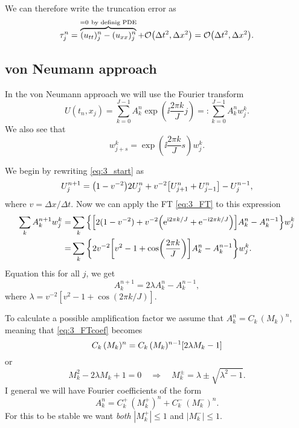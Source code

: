 \documentclass[11pt,letter, swedish, english
]{article}
\newcommand{\Dx}{\ensuremath{\Delta{x}}}
\newcommand{\Dt}{\ensuremath{\Delta{t}}}
\begin{document}
We can therefore write the truncation error as
\begin{equation}
\tau_j^n=
\overbrace{(u_{tt})_j^n-(u_{xx})_j^n}^{=0\ \text{by definig PDE}}
+\order{\Dt^2, \Dx^2}=\order{\Dt^2, \Dx^2}.
\end{equation}

\subsection{von Neumann approach}
In the von Neumann approach we will use the Fourier transform
\begin{equation}\label{eq:3_FT}
U(t_n,x_j)=\sum_{k=0}^{J-1} A_k^n\exp(\ii\frac{2\pi k}{J}j)
=:\sum_{k=0}^{J-1} A_k^nw_j^k.
\end{equation}
We also see that
\begin{equation}
w_{j+s}^k=\exp(\ii\frac{2\pi k}{J}s)w_j^k.
\end{equation}

We begin by rewriting \eqref{eq:3_start} as
\begin{equation}
U_j^{n+1}=\qty(1-v^{-2})2U_j^n+v^{-2}\qty[U_{j+1}^n+U_{j-1}^n]
-U_j^{n-1},
\end{equation}
where $v=\Dx/\Dt$. Now we can apply the FT \eqref{eq:3_FT} to this
expression
\begin{equation}
\begin{aligned}
\sum_kA_k^{n+1}w_j^k=&\sum_k \qty{\qty[
2(1-v^{-2})+v^{-2}\qty(\mathrm{e}^{\mathrm{i}2\pi k/J}+\mathrm{e}^{-\mathrm{i}2\pi k/J})]A_k^n
-A_k^{n-1} }w_j^k\\
=&\sum_k \qty{2v^{-2}\qty[
v^{2}-1+\cos(\frac{2\pi k}{J})]A_k^n
-A_k^{n-1} }w_j^k.
\end{aligned}
\end{equation}
Equation this for all $j$, we get
\begin{equation}\label{eq:3_FTcoef}
A_k^{n+1}=2\lambda A_k^n-A_k^{n-1},
\end{equation}
where $\lambda=v^{-2}[v^{2}-1+\cos(2\pi k/J)]$.

To calculate a possible amplification factor we assume that
$A_k^n=C_k\,(M_k)^n$, meaning that \eqref{eq:3_FTcoef} becomes
\begin{equation}
C_k\,(M_k)^n=C_k\,(M_k)^{n-1}\qty[2\lambda M_k-1]
\end{equation}
or
\begin{equation}
M_k^2-2\lambda M_k+1=0
\quad\Longrightarrow\quad
M_k^\pm=\lambda\pm\sqrt{\lambda^2-1}.
\end{equation}
I  general we will have Fourier coefficients of the form
\begin{equation}
A_k^n=C_k^+\,(M_k^+)^n+C_k^-\,(M_k^-)^n.
\end{equation}
For this to be stable we want \emph{both} $|M_k^+|\le1$ and
$|M_k^-|\le1$. 
\end{document}
